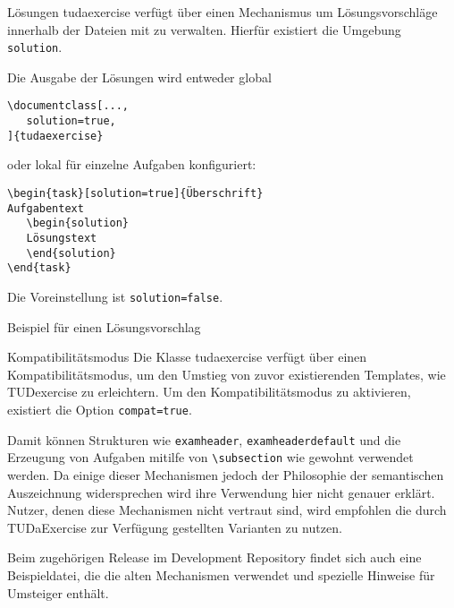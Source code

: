 \documentclass[
	ngerman,
	]{tudaexercise}
\let\code\texttt
\let\cls\textsf
\let\tbs\textbackslash
\begin{document}
\begin{task}[solution=true]{Lösungen}
tudaexercise verfügt über einen Mechanismus um Lösungsvorschläge innerhalb der Dateien mit zu verwalten. Hierfür existiert die Umgebung \code{solution}.

Die Ausgabe der Lösungen wird entweder global
\begin{verbatim}
\documentclass[...,
   solution=true,
]{tudaexercise}
\end{verbatim}
oder lokal für einzelne Aufgaben konfiguriert:

\begin{verbatim}
\begin{task}[solution=true]{Überschrift}
Aufgabentext
   \begin{solution}
   Lösungstext
   \end{solution}
\end{task}
\end{verbatim}
Die Voreinstellung ist \code{solution=false}.
\begin{solution}
Beispiel für einen Lösungsvorschlag
\end{solution}

\end{task}

\begin{task}{Kompatibilitätsmodus}
Die Klasse \cls{tudaexercise} verfügt über einen Kompatibilitätsmodus, um den Umstieg von zuvor existierenden Templates, wie TUDexercise zu erleichtern.
Um den Kompatibilitätsmodus zu aktivieren, existiert die Option \code{compat=true}.

Damit können Strukturen wie \code{examheader}, \code{examheaderdefault} und die Erzeugung von Aufgaben mitilfe von \code{\tbs{}subsection} wie gewohnt verwendet werden. Da einige dieser Mechanismen jedoch der Philosophie der semantischen Auszeichnung widersprechen wird ihre Verwendung hier nicht genauer erklärt. Nutzer, denen diese Mechanismen nicht vertraut sind, wird empfohlen die durch TUDaExercise zur Verfügung gestellten Varianten zu nutzen.

Beim zugehörigen Release im Development Repository findet sich auch eine Beispieldatei, die die alten Mechanismen verwendet und spezielle Hinweise für Umsteiger enthält. %
\end{task}
\end{document}
